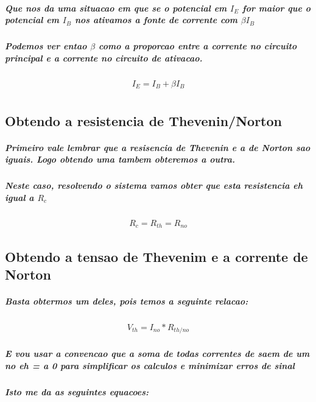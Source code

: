 \documentclass[12pt,twoside, a4paper, twocolumn]{article}
\begin{document}
\subparagraph*{Que nos da uma situacao em que se o potencial em $I_E$ for maior que o potencial em $I_B$  nos ativamos a fonte de corrente com $\beta I_B$}

\subparagraph*{Podemos ver entao $\beta$ como a proporcao entre a corrente no circuito principal e a corrente no circuito de ativacao.}



\begin{equation}
    \begin{aligned}
        I_E = I_B + \beta I_B \\
    \end{aligned}
\end{equation}

\subsection{Obtendo a resistencia de Thevenin/Norton}


\subparagraph*{Primeiro vale lembrar que a resisencia de Thevenin e a de Norton sao iguais. Logo obtendo uma tambem obteremos a outra.
}

\subparagraph*{Neste caso, resolvendo o sistema vamos obter que esta resistencia eh igual a $R_{c}$}

\begin{equation}
    \begin{aligned}
        R_c = R_{th} = R_{no}
    \end{aligned}
\end{equation}

\subsection{Obtendo a tensao de Thevenim e a corrente de Norton}

\subparagraph*{Basta obtermos um deles, pois temos a seguinte relacao:}

\begin{equation}
    \begin{aligned}
        V_{th} = I_{no} * R_{th/no}
    \end{aligned}
\end{equation}

\subparagraph*{E vou usar a convencao que a soma de todas correntes de saem de um no eh = a 0 para simplificar os calculos e minimizar erros de sinal}

\subparagraph*{Isto me da as seguintes equacoes:}
\end{document}
